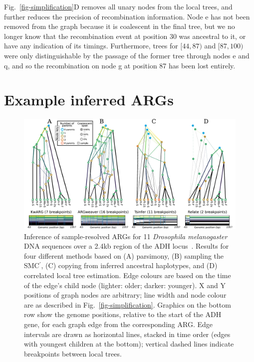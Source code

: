 \documentclass{article}
\newcommand{\noderef}[1]{\textsf{#1}}
\begin{document}
Fig.~\ref{fig-simplification}D removes all unary nodes from the
local trees, and further reduces the precision of
recombination information. Node \noderef{e} has not been
removed from the graph because it is coalescent in the
final tree, but we no longer know that the recombination
event at position 30 was ancestral to it, or have
any indication of its timings. Furthermore,
trees for $[44, 87)$ and $[87, 100)$ were only distinguishable
by the passage of the former tree through nodes \noderef{e}
and \noderef{q}, and so the recombination on node \noderef{g}
at position 87 has been lost entirely.

\section{Example inferred ARGs}
\label{sec-example-inferred-args}

\begin{figure} \begin{center}
\includegraphics[width=\textwidth]{illustrations/inference.pdf} \end{center}
\caption{\label{fig-inferred-args} Inference of sample-resolved ARGs for 11
\textit{Drosophila melanogaster} DNA sequences over a 2.4kb
region of the ADH locus~\citep{kreitman1983nucleotide}.
Results for four different methods based on
(A) parsimony, (B) sampling the SMC$^\prime$, (C) copying from
inferred ancestral haplotypes, and (D) correlated local tree estimation.
Edge colours are based on the time of the edge's child node
(lighter: older; darker: younger).
X and Y positions of graph nodes are arbitrary;
line width and node colour are as described in Fig.~\ref{fig-simplification}.
Graphics on the bottom row show the genome positions, relative to the start of the ADH gene,
for each graph edge from the corresponding ARG. Edge intervals are drawn as horizontal lines,
stacked in time order (edges with youngest children at the bottom);
vertical dashed lines indicate breakpoints between local trees.
}
\end{figure}
\end{document}
